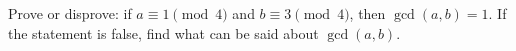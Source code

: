 Prove or disprove: if $a\equiv1\pmod4$ and $b\equiv3\pmod4$, then $\gcd(a,b)=1$. If the statement is false, find what can be said about $\gcd(a,b)$.
